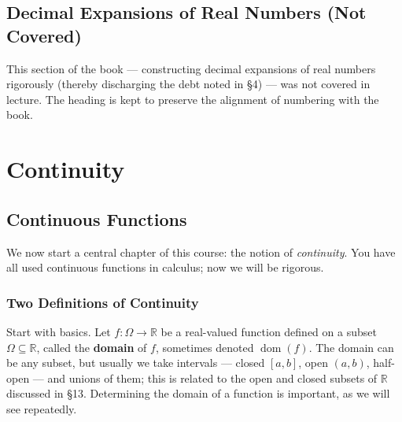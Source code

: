 \documentclass[11pt]{report}
\begin{document}

\section{Decimal Expansions of Real Numbers (Not Covered)}

This section of the book --- constructing decimal expansions of real numbers rigorously (thereby discharging the debt noted in \S 4) --- was not covered in lecture. The heading is kept to preserve the alignment of numbering with the book.


\chapter{Continuity}


\section{Continuous Functions}

We now start a central chapter of this course: the notion of \emph{continuity}. You have all used continuous functions in calculus; now we will be rigorous.

\subsection{Two Definitions of Continuity}

Start with basics. Let $f: \Omega \to \mathbb{R}$ be a real-valued function defined on a subset $\Omega \subseteq \mathbb{R}$, called the \textbf{domain} of $f$, sometimes denoted $\operatorname{dom}(f)$. The domain can be any subset, but usually we take intervals --- closed $[a,b]$, open $(a,b)$, half-open --- and unions of them; this is related to the open and closed subsets of $\mathbb{R}$ discussed in \S 13. Determining the domain of a function is important, as we will see repeatedly.
\end{document}
